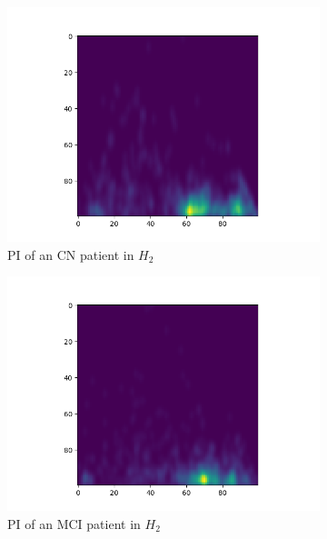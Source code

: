 \documentclass{article}
\begin{document}
\begin{figure}
\begin{subfigure}{0.32\textwidth}
    \includegraphics[width=\textwidth]{figures/PIs/Persistence_image_CN_h_2.png}
    \caption{PI of an CN patient in $H_2$}
  \end{subfigure}
  \begin{subfigure}{0.32\textwidth}
    \includegraphics[width=\textwidth]{figures/PIs/Persistence_image_MCI_h_2.png}
    \caption{PI of an MCI patient in $H_2$}
  \end{subfigure}
  \begin{subfigure}{0.32\textwidth}

\end{subfigure}
\end{figure}
\end{document}
